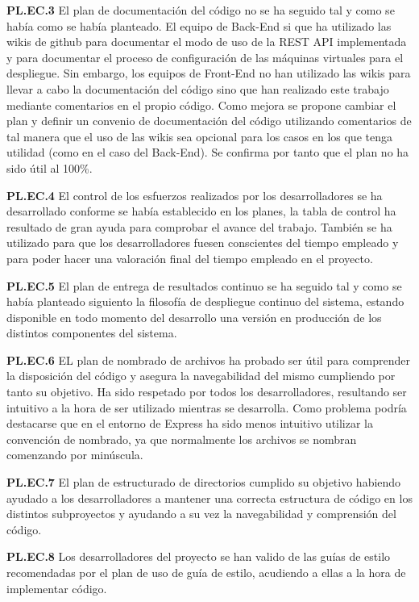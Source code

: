 \documentclass{article}
\begin{document}
\textbf{PL.EC.3}
El plan de documentación del código no se ha seguido tal y como se había como se había planteado. El equipo de Back-End si que ha utilizado las wikis de github para documentar el modo de uso de la REST API implementada y para documentar el proceso de configuración de las máquinas virtuales para el despliegue. Sin embargo, los equipos de Front-End no han utilizado las wikis para llevar a cabo la documentación del código sino que han realizado este trabajo mediante comentarios en el propio código. Como mejora se propone cambiar el plan y definir un convenio de documentación del código utilizando comentarios de tal manera que el uso de las wikis sea opcional para los casos en los que tenga utilidad (como en el caso del Back-End). Se confirma por tanto que el plan no ha sido útil al 100\%.

\textbf{PL.EC.4}
El control de los esfuerzos realizados por los desarrolladores se ha desarrollado conforme se había establecido en los planes, la tabla de control ha resultado de gran ayuda para comprobar el avance del trabajo. También se ha utilizado para que los desarrolladores fuesen conscientes del tiempo empleado y para poder hacer una valoración final del tiempo empleado en el proyecto.

\textbf{PL.EC.5}
El plan de entrega de resultados continuo se ha seguido tal y como se había planteado siguiento la filosofía de despliegue continuo del sistema, estando disponible en todo momento del desarrollo una versión en producción de los distintos componentes del sistema.

\textbf{PL.EC.6}
EL plan de nombrado de archivos ha probado ser útil para comprender la disposición del código y asegura la navegabilidad del mismo cumpliendo por tanto su objetivo. Ha sido respetado por todos los desarrolladores, resultando ser intuitivo a la hora de ser utilizado mientras se desarrolla. Como problema podría destacarse que en el entorno de Express ha sido menos intuitivo utilizar la convención de nombrado, ya que normalmente los archivos se nombran comenzando por minúscula.

\textbf{PL.EC.7}
El plan de estructurado de directorios cumplido su objetivo habiendo ayudado a los desarrolladores a mantener una correcta estructura de código en los distintos subproyectos y ayudando a su vez la navegabilidad y comprensión del código.

\textbf{PL.EC.8}
Los desarrolladores del proyecto se han valido de las guías de estilo recomendadas por el plan de uso de guía de estilo, acudiendo a ellas a la hora de implementar código.
\end{document}
